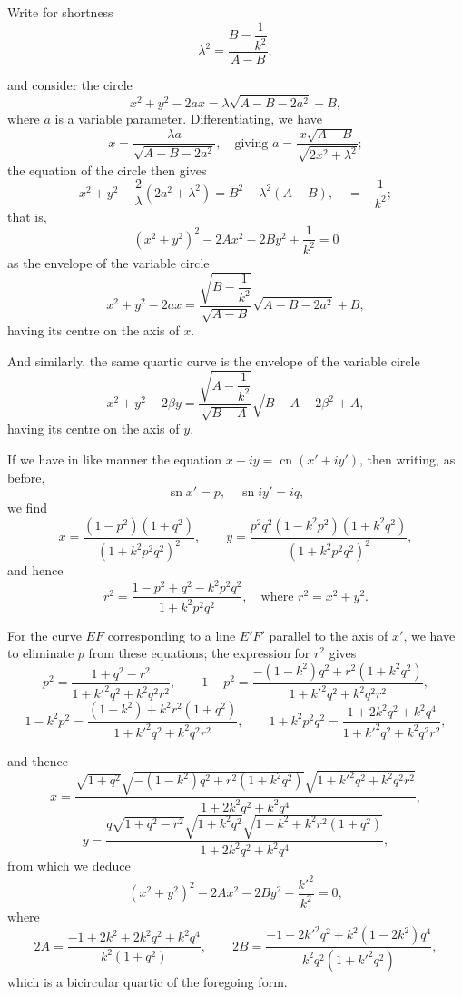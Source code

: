 \documentclass[11pt,a4paper]{article}
\providecommand{\sn}{\operatorname{sn}}
\providecommand{\cn}{\operatorname{cn}}
\begin{document}
Write for shortness
\[
\lambda^2 = \frac{B - \dfrac{1}{k^2}}{A - B},
\]

\newpage

and consider the circle
\[
x^2 + y^2 - 2ax = \lambda\sqrt{A - B - 2a^2} + B,
\]
where $a$ is a variable parameter. Differentiating, we have
\[
x = \frac{\lambda a}{\sqrt{A - B - 2a^2}}, \quad \text{giving } a = \frac{x\sqrt{A - B}}{\sqrt{2x^2 + \lambda^2}};
\]
the equation of the circle then gives
\[
x^2 + y^2 - \frac{2}{\lambda}(2a^2 + \lambda^2) = B^2 + \lambda^2(A - B), \quad = -\frac{1}{k^2};
\]
that is,
\[
(x^2 + y^2)^2 - 2Ax^2 - 2By^2 + \frac{1}{k^2} = 0
\]
as the envelope of the variable circle
\[
x^2 + y^2 - 2ax = \frac{\sqrt{B - \dfrac{1}{k^2}}}{\sqrt{A - B}}\sqrt{A - B - 2a^2} + B,
\]
having its centre on the axis of $x$.

\smallskip
And similarly, the same quartic curve is the envelope of the variable circle
\[
x^2 + y^2 - 2\beta y = \frac{\sqrt{A - \dfrac{1}{k^2}}}{\sqrt{B - A}}\sqrt{B - A - 2\beta^2} + A,
\]
having its centre on the axis of $y$.

\smallskip
If we have in like manner the equation $x + iy = \cn(x' + iy')$, then writing, as before,
\[
\sn x' = p, \quad \sn iy' = iq,
\]
we find
\[
x = \frac{(1 - p^2)(1 + q^2)}{(1 + k^2 p^2 q^2)^2}, \qquad y = \frac{p^2 q^2(1 - k^2 p^2)(1 + k^2 q^2)}{(1 + k^2 p^2 q^2)^2},
\]
and hence
\[
r^2 = \frac{1 - p^2 + q^2 - k^2 p^2 q^2}{1 + k^2 p^2 q^2}, \quad \text{where } r^2 = x^2 + y^2.
\]

For the curve $EF$ corresponding to a line $E'F'$ parallel to the axis of $x'$, we have to eliminate $p$ from these equations; the expression for $r^2$ gives
\[
p^2 = \frac{1 + q^2 - r^2}{1 + k'^2 q^2 + k^2 q^2 r^2}, \qquad 1 - p^2 = \frac{-(1 - k^2)q^2 + r^2(1 + k^2 q^2)}{1 + k'^2 q^2 + k^2 q^2 r^2},
\]
\[
1 - k^2 p^2 = \frac{(1 - k^2) + k^2 r^2(1 + q^2)}{1 + k'^2 q^2 + k^2 q^2 r^2}, \qquad 1 + k^2 p^2 q^2 = \frac{1 + 2k^2 q^2 + k^2 q^4}{1 + k'^2 q^2 + k^2 q^2 r^2},
\]

\newpage

and thence
\[
x = \frac{\sqrt{1 + q^2}\sqrt{-(1 - k^2)q^2 + r^2(1 + k^2 q^2)}\sqrt{1 + k'^2 q^2 + k^2 q^2 r^2}}{1 + 2k^2 q^2 + k^2 q^4},
\]
\[
y = \frac{q\sqrt{1 + q^2 - r^2}\sqrt{1 + k^2 q^2}\sqrt{1 - k^2 + k^2 r^2(1 + q^2)}}{1 + 2k^2 q^2 + k^2 q^4},
\]
from which we deduce
\[
(x^2 + y^2)^2 - 2Ax^2 - 2By^2 - \frac{k'^2}{k^2} = 0,
\]
where
\[
2A = \frac{-1 + 2k^2 + 2k^2 q^2 + k^2 q^4}{k^2(1 + q^2)}, \qquad 2B = \frac{-1 - 2k'^2 q^2 + k^2(1 - 2k^2)q^4}{k^2 q^2 (1 + k'^2 q^2)},
\]
which is a bicircular quartic of the foregoing form.
\end{document}
